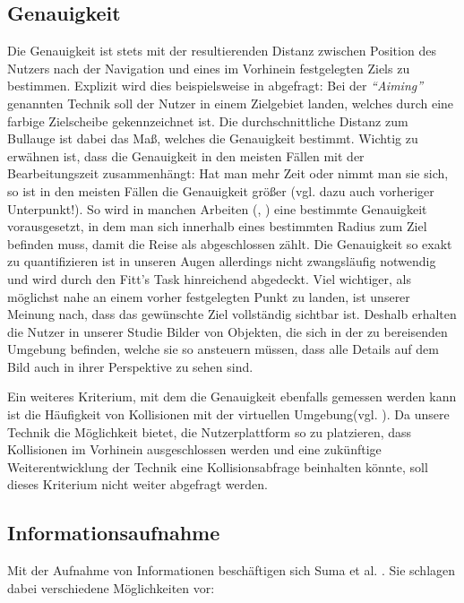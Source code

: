 \subsection{Genauigkeit}
Die Genauigkeit ist stets mit der resultierenden Distanz zwischen Position des Nutzers nach der Navigation und eines im Vorhinein festgelegten Ziels zu bestimmen. 
Explizit wird dies beispielsweise in \cite{Krekhov2018GulliVR} abgefragt: Bei der \textit{“Aiming”} genannten Technik soll der Nutzer in einem Zielgebiet landen, welches durch eine farbige Zielscheibe gekennzeichnet ist. Die durchschnittliche Distanz zum Bullauge ist dabei das Maß, welches die Genauigkeit bestimmt.
Wichtig zu erwähnen ist, dass die Genauigkeit in den meisten Fällen mit der Bearbeitungszeit zusammenhängt: Hat man mehr Zeit oder nimmt man sie sich, so ist in den meisten Fällen die Genauigkeit größer (vgl. dazu auch vorheriger Unterpunkt!).
So wird in manchen Arbeiten (\cite{BowmanTestbedTechniques}, \cite{3_Pierce1997}) eine bestimmte Genauigkeit vorausgesetzt, in dem man sich innerhalb eines bestimmten Radius zum Ziel befinden muss, damit die Reise als abgeschlossen zählt.
Die Genauigkeit so exakt zu quantifizieren ist in unseren Augen allerdings nicht zwangsläufig notwendig und wird durch den Fitt's Task hinreichend abgedeckt. 
Viel wichtiger, als möglichst nahe an einem vorher festgelegten Punkt zu landen, ist unserer Meinung nach, dass das gewünschte Ziel vollständig sichtbar ist. 
Deshalb erhalten die Nutzer in unserer Studie Bilder von Objekten, die sich in der zu bereisenden Umgebung befinden, welche sie so ansteuern müssen, dass alle Details auf dem Bild auch in ihrer Perspektive zu sehen sind.

Ein weiteres Kriterium, mit dem die Genauigkeit ebenfalls gemessen werden kann ist die Häufigkeit von Kollisionen mit der virtuellen Umgebung(vgl. \cite{Suma2010EvaluationEnvironments}). Da unsere Technik die Möglichkeit bietet, die Nutzerplattform so zu platzieren, dass Kollisionen im Vorhinein ausgeschlossen werden und eine zukünftige Weiterentwicklung der Technik eine Kollisionsabfrage beinhalten könnte, soll dieses Kriterium nicht weiter abgefragt werden.


\subsection{Informationsaufnahme}
Mit der Aufnahme von Informationen beschäftigen sich Suma et al. \cite{Suma2010EvaluationEnvironments}. Sie schlagen dabei verschiedene Möglichkeiten vor:


